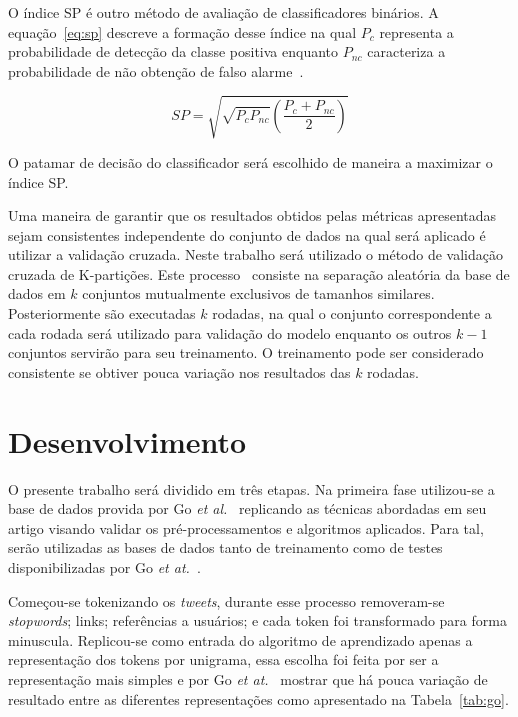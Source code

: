 O índice SP é outro método de avaliação de classificadores binários.
A equação~\ref{eq:sp} descreve a formação desse índice na qual $P_c$ representa a probabilidade de detecção da classe
positiva enquanto $P_{nc}$ caracteriza a probabilidade de não obtenção de falso alarme~\cite{ciodaro12}.

\begin{equation} \label{eq:sp}
    SP = \sqrt{\sqrt{P_c P_{nc}}(\frac{P_c + P_{nc}}{2})}
\end{equation}

O patamar de decisão do classificador será escolhido de maneira a maximizar o índice SP.

Uma maneira de garantir que os resultados obtidos pelas métricas apresentadas sejam consistentes independente do
conjunto de dados na qual será aplicado é utilizar a validação cruzada.
Neste trabalho será utilizado o método de validação cruzada de K-partições.
Este processo~\cite{kohavi95} consiste na separação aleatória da base de dados em $k$ conjuntos mutualmente exclusivos
de tamanhos similares.
Posteriormente são executadas $k$ rodadas, na qual o conjunto correspondente a cada rodada será utilizado para validação
do modelo enquanto os outros $k-1$ conjuntos servirão para seu treinamento.
O treinamento pode ser considerado consistente se obtiver pouca variação nos resultados das $k$ rodadas.

\section{Desenvolvimento} \label{sec:desenvolvimento}

O presente trabalho será dividido em três etapas.
Na primeira fase utilizou-se a base de dados provida por Go \textit{et al.}~\cite{go09} replicando as técnicas
abordadas em seu artigo visando validar os pré-processamentos e algoritmos aplicados.
Para tal, serão utilizadas as bases de dados tanto de treinamento como de testes disponibilizadas por Go
\textit{et at.}~\cite{go09}.

Começou-se tokenizando os \textit{tweets}, durante esse processo removeram-se \textit{stopwords}; links; referências a usuários;
e cada token foi transformado para forma minuscula.
Replicou-se como entrada do algoritmo de aprendizado apenas a representação dos tokens por unigrama, essa escolha foi
feita por ser a representação mais simples e por Go \textit{et at.}~\cite{go09} mostrar que há pouca variação de
resultado entre as diferentes representações como apresentado na Tabela~\ref{tab:go}.

